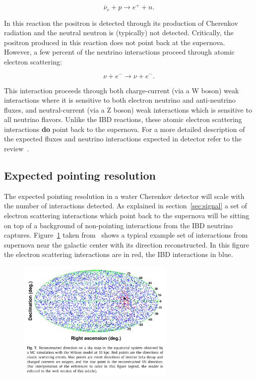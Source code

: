 \documentclass[11pt]{article}
\begin{document}
$$ \overline{\nu}_{e}+ p \rightarrow e^{+} + n. $$

In this reaction the positron is detected through its production of
Cherenkov radiation and the neutral neutron is (typically) not
detected.  Critically, the positron produced in this reaction does not
point back at the supernova.   However, a few percent of the neutrino interactions proceed
through atomic electron scattering:

$$ \nu + e^{-} \rightarrow \nu + e^{-} .$$

This interaction proceeds through both charge-current (via a W boson)
weak interactions where it is sensitive to both electron neutrino and
anti-neutrino fluxes, and neutral-current (via a Z boson) weak
interactions which is sensitive to all neutrino flavors. Unlike the
IBD reactions, these atomic electron scattering interactions {\bf do} point
back to the supernova.  For a more detailed description of the
expected fluxes and neutrino interactions expected in detector refer
to the review~\cite{2012ARNPS..62...81S}.

\subsection{Expected pointing resolution}

The expected pointing resolution in a water Cherenkov detector will
scale with the number of interactions detected.  As explained in
section~\ref{sec:signal} a set of electron scattering interactions which
point back to the supernova will be sitting on top of a background of
non-pointing interactions from the IBD neutrino captures.
Figure~\ref{fig:SK-realtime-monitor-pointing} taken
from~\cite{2016APh....81...39A} shows a typical example set of
interactions from supernova near the galactic center with its
direction reconstructed.  In this figure the electron scattering
interactions are in red, the IBD interactions in blue.

\begin{figure}
  \begin{center}
    \includegraphics[width=3.0in]{SK-realtime-monitor-pointing}
    \caption{}
    \label{fig:SK-realtime-monitor-pointing}
  \end{center}
\end{figure}
\end{document}
